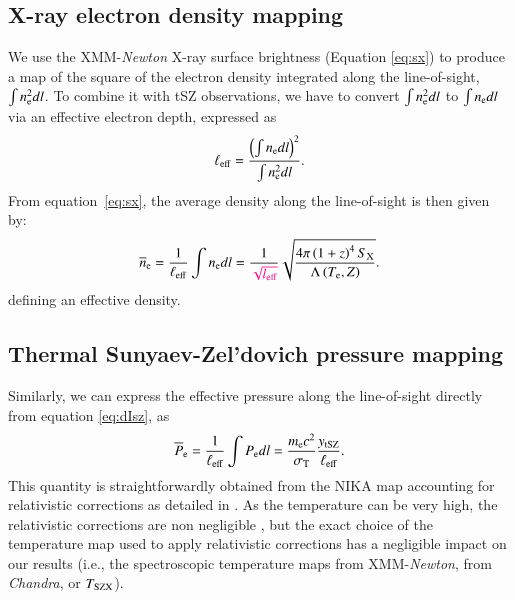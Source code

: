 \documentclass[twocolumn,traditabstract]{aa}
\newcommand{\ccor}[1]{\textcolor{Mypink}{#1}}
\def\TSZ {T_{\rm SZX}}
\begin{document}
\subsection{X-ray electron density mapping}
We use the XMM-\textit{Newton} X-ray surface brightness (Equation \ref{eq:sx}) to produce a map of the square of the electron density integrated along the line-of-sight, $\int n_{\rm e}^2 dl$. To combine it with tSZ observations, we have to convert $\int n_{\rm e}^2 dl$ to $\int n_{\rm e} dl$ via an effective electron depth, expressed as
\begin{equation}
	\ell_{\rm eff} = \frac{\left(\int n_{\rm e} dl\right)^2}{\int n_{\rm e}^2 dl}.
\label{eq:l_eff}
\end{equation}
From equation~\ref{eq:sx}, the \ccor{average} density along the line-of-sight is then given by:
\begin{equation}
	\overline{n}_{\rm e} = \frac{1}{\ell_{\rm eff}} \int n_{\rm e} dl = \frac{1}{\ccor{\sqrt{l_{\rm eff}}}}\sqrt{\frac{4 \pi \left(1+z\right)^4 S_{\rm X}}{\Lambda\left(T_{\rm e}, Z\right)}}.
\label{eq:pseudo_ne}
\end{equation}
\ccor{defining an effective density.}

\subsection{Thermal Sunyaev-Zel'dovich pressure mapping}
\ccor{Similarly,} we can express the effective pressure along the line-of-sight directly from equation \ref{eq:dIsz}, as
\begin{equation}
	\overline{P}_{\rm e} = \frac{1}{\ell_{\rm eff}} \int P_{\rm e} dl = \frac{m_{\rm e} c^2}{\sigma_{\rm T}} \frac{y_{\rm tSZ}}{\ell_{\rm eff}}.
\label{eq:pseudo_p}
\end{equation}
This quantity is straightforwardly obtained from the NIKA map accounting for relativistic corrections as detailed in \cite{Adam2016b}. As the temperature can be very high, the relativistic corrections are non negligible \citep{Pointecouteau1998,Itoh2003}, but the exact choice of the temperature map used to apply relativistic corrections has a negligible impact on our results \ccor{(i.e., the spectroscopic temperature maps from XMM-\textit{Newton}, from \textit{Chandra}, or $\TSZ$)}. 

\end{document}
